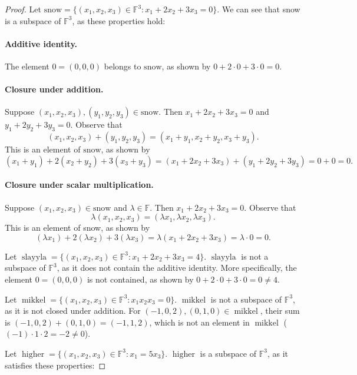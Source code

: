 \documentclass{exam}
\begin{document}
\begin{proof}
    Let $\text{snow} = \{(x_1,x_2,x_3)\in\mathbb F^3:x_1 + 2x_2 + 3x_3 = 0\}$. We can see that snow is a subspace of $\mathbb F^3$, as these properties hold:
    \paragraph{Additive identity.} The element $0 = (0, 0, 0)$ belongs to $\text{snow}$, as shown by $0 + 2\cdot0 + 3\cdot0 = 0$.

    \paragraph{Closure under addition.} Suppose $(x_1, x_2, x_3),(y_1, y_2, y_3)\in\text{snow}$. Then $x_1 + 2x_2 + 3x_3 = 0$ and $y_1 + 2y_2 + 3y_3 = 0$. Observe that \[
        (x_1, x_2, x_3) + (y_1, y_2, y_3) = (x_1 + y_1, x_2 + y_2, x_3 + y_3).
    \]
    This is an element of $\text{snow}$, as shown by \[
        (x_1 + y_1) + 2(x_2 + y_2) + 3(x_3 + y_3) = (x_1 + 2x_2 + 3x_3) + (y_1 + 2y_2 + 3y_3) = 0 + 0 =0.
    \]

    \paragraph{Closure under scalar multiplication.} Suppose $(x_1, x_2, x_3)\in\text{snow}$ and $\lambda\in\mathbb F$. Then $x_1 + 2x_2 + 3x_3 = 0$. Observe that \[
        \lambda(x_1, x_2, x_3) = (\lambda x_1, \lambda x_2, \lambda x_3).
    \]
    This is an element of snow, as shown by \[
        (\lambda x_1) + 2(\lambda x_2) + 3(\lambda x_3) = \lambda(x_1 + 2x_2 + 3x_3) = \lambda\cdot0 = 0.
    \]

    Let $\operatorname{slayyla} = \{(x_1,x_2,x_3)\in\mathbb F^3:x_1 + 2x_2 + 3x_3 = 4\}$. $\operatorname{slayyla}$ is not a subspace of $\mathbb F^3$, as it does not contain the additive identity. More specifically, the element $0 = (0, 0, 0)$ is not contained, as shown by $0 + 2\cdot0 + 3\cdot0 = 0 \neq 4$.

    Let $\operatorname{mikkel} = \{(x_1, x_2, x_3)\in\mathbb F^3: x_1x_2x_3 = 0\}$. $\operatorname{mikkel}$ is not a subspace of $\mathbb F^3$, as it is not closed under addition. For $(-1, 0, 2),(0, 1, 0)\in\operatorname{mikkel}$, their sum is $(-1, 0, 2) + (0, 1, 0) = (-1, 1, 2)$, which is not an element in $\operatorname{mikkel}$ ($(-1)\cdot1\cdot2 = -2 \neq 0$).

    Let $\operatorname{higher} = \{(x_1, x_2, x_3) \in \mathbb F^3: x_1 = 5x_3\}$. $\operatorname{higher}$ is a subspace of $\mathbb F^3$, as it satisfies these properties:

\end{proof}
\end{document}
